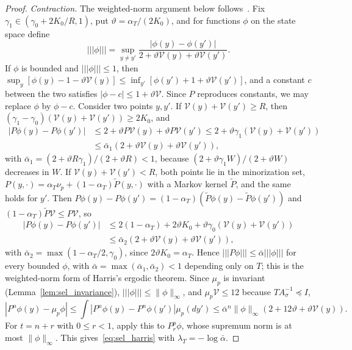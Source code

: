 \begin{proof}
\emph{Contraction.} The weighted-norm argument below follows~\cite{HairerMattingly2011}. Fix $\gamma_1\in(\gamma_0+2K_0/R,1)$, put $\vartheta=\alpha_T/(2K_0)$, and for functions $\phi$ on the state space define
\[
|||\phi|||=\sup_{y\ne y'}\frac{|\phi(y)-\phi(y')|}{2+\vartheta\mathcal V(y)+\vartheta\mathcal V(y')}.
\]
If $\phi$ is bounded and $|||\phi|||\le1$, then $\sup_y[\phi(y)-1-\vartheta\mathcal V(y)]\le\inf_{y'}[\phi(y')+1+\vartheta\mathcal V(y')]$, and a constant $c$ between the two satisfies $|\phi-c|\le1+\vartheta\mathcal V$. Since $P$ reproduces constants, we may replace $\phi$ by $\phi-c$. Consider two points $y,y'$. If $\mathcal V(y)+\mathcal V(y')\ge R$, then $(\gamma_1-\gamma_0)(\mathcal V(y)+\mathcal V(y'))\ge2K_0$, and
\[
\begin{aligned}
|P\phi(y)-P\phi(y')|&\le2+\vartheta P\mathcal V(y)+\vartheta P\mathcal V(y')\le2+\vartheta\gamma_1(\mathcal V(y)+\mathcal V(y'))\\
&\le\bar\alpha_1(2+\vartheta\mathcal V(y)+\vartheta\mathcal V(y')),
\end{aligned}
\]
with $\bar\alpha_1=(2+\vartheta R\gamma_1)/(2+\vartheta R)<1$, because $(2+\vartheta\gamma_1W)/(2+\vartheta W)$ decreases in $W$. If $\mathcal V(y)+\mathcal V(y')<R$, both points lie in the minorization set, $P(y,\cdot)=\alpha_T\nu_p+(1-\alpha_T)\tilde P(y,\cdot)$ with a Markov kernel $\tilde P$, and the same holds for $y'$. Then $P\phi(y)-P\phi(y')=(1-\alpha_T)(\tilde P\phi(y)-\tilde P\phi(y'))$ and $(1-\alpha_T)\tilde P\mathcal V\le P\mathcal V$, so
\[
\begin{aligned}
|P\phi(y)-P\phi(y')|&\le2(1-\alpha_T)+2\vartheta K_0+\vartheta\gamma_0(\mathcal V(y)+\mathcal V(y'))\\
&\le\bar\alpha_2(2+\vartheta\mathcal V(y)+\vartheta\mathcal V(y')),
\end{aligned}
\]
with $\bar\alpha_2=\max(1-\alpha_T/2,\gamma_0)$, since $2\vartheta K_0=\alpha_T$. Hence $|||P\phi|||\le\bar\alpha|||\phi|||$ for every bounded $\phi$, with $\bar\alpha=\max(\bar\alpha_1,\bar\alpha_2)<1$ depending only on $T$; this is the weighted-norm form of Harris's ergodic theorem. Since $\mu_p$ is invariant (Lemma~\ref{lem:sel_invariance}), $|||\phi|||\le\|\phi\|_\infty$, and $\mu_p\mathcal V\le12$ because $TA_\sigma^{-1}\preceq I$,
\[
|P^n\phi(y)-\mu_p\phi|\le\int|P^n\phi(y)-P^n\phi(y')|\mu_p(dy')\le\bar\alpha^n\|\phi\|_\infty(2+12\vartheta+\vartheta\mathcal V(y)).
\]
For $t=n+r$ with $0\le r<1$, apply this to $P^p_r\phi$, whose supremum norm is at most $\|\phi\|_\infty$. This gives~\eqref{eq:sel_harris} with $\lambda_T=-\log\bar\alpha$.
\end{proof}

